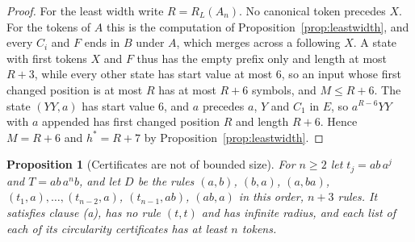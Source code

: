 \documentclass[11pt,a4paper]{article}
\theoremstyle{definition}
\theoremstyle{plain}
\newtheorem{proposition}{Proposition}
\newcommand{\ripple}{R_{L}}
\begin{document}
\begin{proof}
For the least width write \(R = \ripple(A_n)\). No canonical token precedes \(X\). For the tokens of \(A\) this is the
computation of Proposition~\ref{prop:leastwidth}, and every \(C_i\) and \(F\) ends in \(B\) under \(A\), which merges
across a following \(X\). A state with first tokens \(X\) and \(F\) thus has the empty prefix only and length at most
\(R + 3\), while every other state has start value at most \(6\), so an input whose first changed position is at most
\(R\) has at most \(R + 6\) symbols, and \(M \le R + 6\). The state \((YY, a)\) has start value \(6\), and \(a\)
precedes \(a\), \(Y\) and \(C_1\) in \(E\), so \(a^{R - 6} YY\) with \(a\) appended has first changed position \(R\) and
length \(R + 6\). Hence \(M = R + 6\) and \(h^* = R + 7\) by Proposition~\ref{prop:leastwidth}.
\end{proof}


\begin{proposition}[Certificates are not of bounded size]\label{prop:certsize}
For \(n \ge 2\) let \(t_j = ab\,a^j\) and \(T = ab\,a^n b\), and let \(D\) be the rules \((a, b)\), \((b, a)\),
\((a, ba)\), \((t_1, a), \dots, (t_{n-2}, a)\), \((t_{n-1}, ab)\), \((ab, a)\) in this order, \(n + 3\) rules. It
satisfies clause (a), has no rule \((t, t)\) and has infinite radius, and each list of each of its circularity
certificates has at least \(n\) tokens.
\end{proposition}
\end{document}
